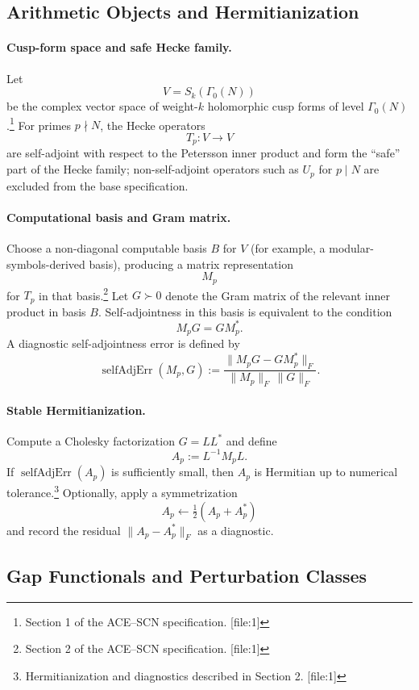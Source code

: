 \documentclass[11pt]{article}
\begin{document}
\subsection{Arithmetic Objects and Hermitianization}

\paragraph{Cusp-form space and safe Hecke family.} Let
\[
V = S_k(\Gamma_0(N))
\]
be the complex vector space of weight-\(k\) holomorphic cusp forms of level \(\Gamma_0(N)\).\footnote{Section 1 of the ACE--SCN specification. [file:1]} For primes \(p\nmid N\), the Hecke operators
\[
T_p : V \to V
\]
are self-adjoint with respect to the Petersson inner product and form the ``safe'' part of the Hecke family; non-self-adjoint operators such as \(U_p\) for \(p\mid N\) are excluded from the base specification.

\paragraph{Computational basis and Gram matrix.} Choose a non-diagonal computable basis \(B\) for \(V\) (for example, a modular-symbols-derived basis), producing a matrix representation
\[
M_p
\]
for \(T_p\) in that basis.\footnote{Section 2 of the ACE--SCN specification. [file:1]} Let \(G\succ 0\) denote the Gram matrix of the relevant inner product in basis \(B\). Self-adjointness in this basis is equivalent to the condition
\[
M_p G = G M_p^*.
\]
A diagnostic self-adjointness error is defined by
\[
\operatorname{selfAdjErr}(M_p,G)
  := \frac{\|M_p G - G M_p^*\|_F}{\|M_p\|_F \,\|G\|_F}.
\]

\paragraph{Stable Hermitianization.} Compute a Cholesky factorization \(G = LL^*\) and define
\[
A_p := L^{-1} M_p L.
\]
If \(\operatorname{selfAdjErr}(A_p)\) is sufficiently small, then \(A_p\) is Hermitian up to numerical tolerance.\footnote{Hermitianization and diagnostics described in Section 2. [file:1]} Optionally, apply a symmetrization
\[
A_p \leftarrow \tfrac12 (A_p + A_p^*)
\]
and record the residual \(\|A_p - A_p^*\|_F\) as a diagnostic.

\subsection{Gap Functionals and Perturbation Classes}
\end{document}
